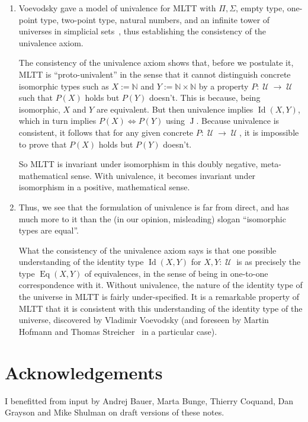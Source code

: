 \documentclass{article}
\newcommand{\N}{\mathbb{N}}
\newcommand{\Id}{\operatorname{Id}}
\newcommand{\J}{\operatorname{J}}
\newcommand{\U}{\operatorname{\mathcal{U}}}
\newcommand{\Eq}{\operatorname{Eq}}
\begin{document}
\begin{enumerate}
  \item Voevodsky gave a model of univalence for MLTT with
    $\Pi,\Sigma$, empty type, one-point type, two-point type, natural
    numbers, and an infinite tower of universes in simplicial
    sets~\cite{kapulkin:lumsdaine:voevodsky,kapulkin:lumsdaine}, thus
    establishing the consistency of the univalence axiom.
    
    The consistency of the univalence axiom shows that, before we
    postulate it, MLTT is ``proto-univalent'' in the sense that it
    cannot distinguish concrete isomorphic types such as $X:=\N$ and
    $Y:=\N\times \N$ by a property $P:\U\to \U$ such that $P(X)$ holds
    but $P(Y)$ doesn't.  This is because, being isomorphic, $X$ and
    $Y$ are equivalent. But then univalence implies $\Id(X,Y)$, which
    in turn implies $P(X) \iff P(Y)$ using $\J$.  Because univalence
    is consistent, it follows that for any given concrete
    $P:\U\to \U$, it is impossible to prove that $P(X)$ holds but
    $P(Y)$ doesn't.

    So MLTT is invariant under isomorphism in this doubly negative,
    meta-mathematical sense. With univalence, it becomes invariant
    under isomorphism in a positive, mathematical sense.

 \item Thus, we see that the formulation of univalence is far from
    direct, and has much more to it than the (in our opinion,
    misleading) slogan ``isomorphic types are equal''.

    What the consistency of the univalence axiom says is that one
    possible understanding of the identity type $\Id(X,Y)$ for
    $X,Y:\U$ is as precisely the type $\Eq(X,Y)$ of equivalences, in
    the sense of being in one-to-one correspondence with it. Without
    univalence, the nature of the identity type of the universe in
    MLTT is fairly under-specified. It is a remarkable property of
    MLTT that it is consistent with this understanding of the identity
    type of the universe, discovered by Vladimir Voevodsky (and
    foreseen by Martin Hofmann and Thomas Streicher~\cite{MR1686862}
    in a particular case).
  \end{enumerate}

  \section*{Acknowledgements}

  I benefitted from input by Andrej Bauer, Marta Bunge, Thierry
  Coquand, Dan Grayson and Mike Shulman on draft versions of these
  notes.
  


\end{document}
